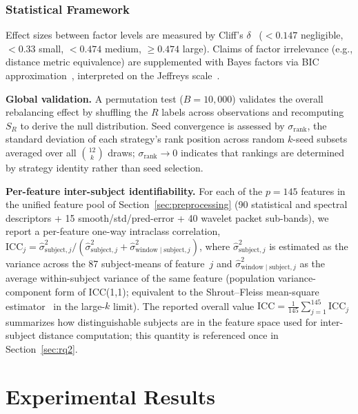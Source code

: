 \documentclass[lettersize,journal]{IEEEtran}
\begin{document}
\subsubsection{Statistical Framework}
Effect sizes between factor levels are measured by Cliff's $\delta$~\cite{cliff1993} ($< 0.147$ negligible, $< 0.33$ small, $< 0.474$ medium, $\geq 0.474$ large).
Claims of factor irrelevance (e.g., distance metric equivalence) are supplemented with Bayes factors via BIC approximation~\cite{wagenmakers2007}, interpreted on the Jeffreys scale~\cite{jeffreys1961}.

\textbf{Global validation.}
A permutation test ($B = 10{,}000$) validates the overall rebalancing effect by shuffling the $R$ labels across observations and recomputing $S_R$ to derive the null distribution.
Seed convergence is assessed by $\sigma_{\text{rank}}$, the standard deviation of each strategy's rank position across random $k$-seed subsets averaged over all $\binom{12}{k}$ draws; $\sigma_{\text{rank}} \to 0$ indicates that rankings are determined by strategy identity rather than seed selection.

\textbf{Per-feature inter-subject identifiability.}
For each of the $p = 145$ features in the unified feature pool of Section~\ref{sec:preprocessing} (90 statistical and spectral descriptors + 15 smooth/std/pred-error + 40 wavelet packet sub-bands), we report a per-feature one-way intraclass correlation,
$\mathrm{ICC}_j = \hat{\sigma}^2_{\mathrm{subject},j} / (\hat{\sigma}^2_{\mathrm{subject},j} + \hat{\sigma}^2_{\mathrm{window} \mid \mathrm{subject},j})$,
where $\hat{\sigma}^2_{\mathrm{subject},j}$ is estimated as the variance across the 87 subject-means of feature~$j$ and $\hat{\sigma}^2_{\mathrm{window} \mid \mathrm{subject},j}$ as the average within-subject variance of the same feature (population variance-component form of ICC(1,1); equivalent to the Shrout--Fleiss mean-square estimator~\cite{shrout1979} in the large-$k$ limit).
The reported overall value $\mathrm{ICC} = \frac{1}{145}\sum_{j=1}^{145} \mathrm{ICC}_j$ summarizes how distinguishable subjects are in the feature space used for inter-subject distance computation; this quantity is referenced once in Section~\ref{sec:rq2}.

\section{Experimental Results}
\label{sec:experiments}
\end{document}
